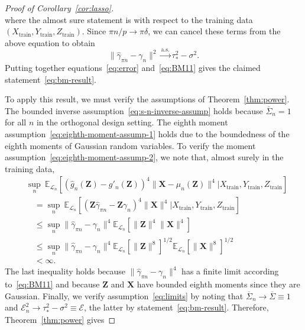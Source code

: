 \documentclass[12pt]{article}
\theoremstyle{definition}
\theoremstyle{remark}
\newcommand{\prx}{\bm X}
\newcommand{\srx}{X}
\newcommand{\prz}{\bm Z}
\newcommand{\srz}{Z}
\newcommand{\sry}{Y}
\begin{document}
\begin{proof}[Proof of Corollary~\ref{cor:lasso}]
\begin{equation}
\end{equation}
where the almost sure statement is with respect to the training data $(\srx_{\text{train}}, \sry_{\text{train}}, \srz_{\text{train}})$. Since $\pi n/p \rightarrow \pi \delta$, we can cancel these terms from the above equation to obtain
\begin{equation}
	\|\widehat \gamma_{\pi n} - \gamma_n\|^2 \overset{\text{a.s.}}\rightarrow \tau_*^2 - \sigma^2.
	\label{eq:BM11}
\end{equation}
Putting together equations~\eqref{eq:error} and~\eqref{eq:BM11} gives the claimed statement~\eqref{eq:bm-result}. 

To apply this result, we must verify the assumptions of Theorem~\ref{thm:power}. The bounded inverse assumption~\eqref{eq:s-n-inverse-assump} holds because $\overline \Sigma_n = 1$ for all $n$ in the orthogonal design setting. The eighth moment assumption~\eqref{eq:eighth-moment-assump-1} holds due to the boundedness of the eighth moments of Gaussian random variables. To verify the moment assumption~\eqref{eq:eighth-moment-assump-2}, we note that, almost surely in the training data,
\begin{equation*}
\begin{split}
&\sup_n\ \mathbb E_{\mathcal L_n}[(\widehat g_n(\prz)-g'_n(\prz))^4\|\prx - \mu_n(\prz)\|^4|\srx_{\text{train}}, \sry_{\text{train}}, \srz_{\text{train}}] \\
&\quad= \sup_n\ \mathbb E_{\mathcal L_n}[(\prz \widehat \gamma_{\pi n} - \prz \gamma_n)^4\|\prx\|^4|\srx_{\text{train}}, \sry_{\text{train}}, \srz_{\text{train}}] \\
&\quad\leq \sup_n\|\widehat \gamma_{\pi n} - \gamma_n\|^4  \mathbb E_{\mathcal L_n}[\|\prz\|^4\|\prx\|^4] \\
&\quad\leq \sup_n\|\widehat \gamma_{\pi n} - \gamma_n\|^4  \mathbb E_{\mathcal L_n}[\|\prz\|^8]^{1/2} \mathbb E_{\mathcal L_n}[\|\prx\|^8]^{1/2} \\
&\quad < \infty.
\end{split}
\end{equation*}
The last inequality holds because $\|\widehat \gamma_{\pi n} - \gamma_n\|^4$ has a finite limit according to~\eqref{eq:BM11} and because $\prz$ and $\prx$ have bounded eighth moments since they are Gaussian. Finally, we verify assumption~\eqref{eq:limits} by noting that $\overline \Sigma_n\rightarrow \overline \Sigma \equiv 1$ and $\mathcal E_n^2 \rightarrow \tau_*^2 - \sigma^2 \equiv \mathcal E$, the latter by statement~\eqref{eq:bm-result}. Therefore, Theorem~\ref{thm:power} gives 

\end{proof}
\end{document}
